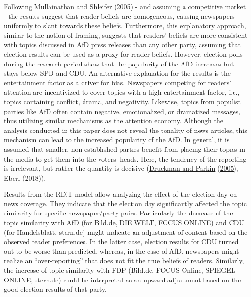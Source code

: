 \documentclass[
  12pt,
]{article}
\begin{document}
Following \protect\hyperlink{ref-mullainathan_market_2005}{Mullainathan
and Shleifer} (\protect\hyperlink{ref-mullainathan_market_2005}{2005}) -
and assuming a competitive market - the results suggest that reader
beliefs are homogeneous, causing newspapers uniformly to slant towards
these beliefs. Furthermore, this explanatory approach, similar to the
notion of framing, suggests that readers' beliefs are more consistent
with topics discussed in AfD press releases than any other party,
assuming that election results can be used as a proxy for reader
beliefs. However, election polls during the research period show that
the popularity of the AfD increases but stays below SPD and CDU. An
alternative explanation for the results is the entertainment factor as a
driver for bias. Newspapers competing for readers' attention are
incentivized to cover topics with a high entertainment factor, i.e.,
topics containing conflict, drama, and negativity. Likewise, topics from
populist parties like AfD often contain negative, emotionalized, or
dramatized messages, thus utilizing similar mechanisms as the attention
economy. Although the analysis conducted in this paper does not reveal
the tonality of news articles, this mechanism can lead to the increased
popularity of the AfD. In general, it is assumed that smaller,
non-established parties benefit from placing their topics in the media
to get them into the voters' heads. Here, the tendency of the reporting
is irrelevant, but rather the quantity is decisive
(\protect\hyperlink{ref-druckman_impact_2005}{Druckman and Parkin}
(\protect\hyperlink{ref-druckman_impact_2005}{2005}),
\protect\hyperlink{ref-eberl_lying_2018}{Eberl}
(\protect\hyperlink{ref-eberl_lying_2018}{2018})).

Results from the RDiT model allow analyzing the effect of the election
day on news coverage. They indicate that the election day significantly
affected the topic similarity for specific newspaper/party pairs.
Particularly the decrease of the topic similarity with AfD (for Bild.de,
DIE WELT, FOCUS ONLINE) and CDU (for Handelsblatt, stern.de) might
indicate an adjustment of content based on the observed reader
preferences. In the latter case, election results for CDU turned out to
be worse than predicted, whereas, in the case of AfD, newspapers might
realize an ``over-reporting'' that does not fit the true beliefs of
readers. Similarly, the increase of topic similarity with FDP (Bild.de,
FOCUS Online, SPIEGEL ONLINE, stern.de) could be interpreted as an
upward adjustment based on the good election results of that party.
\end{document}
